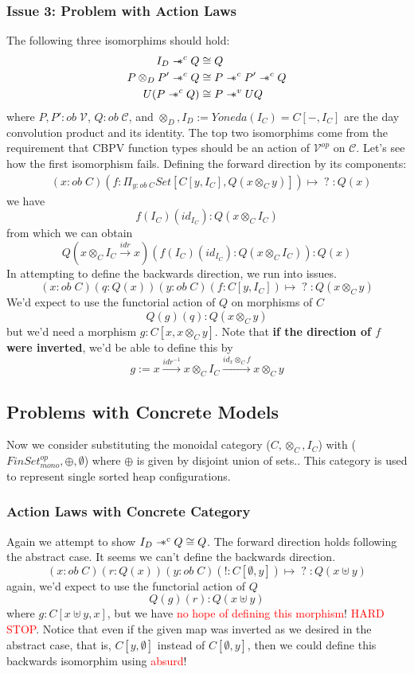 \documentclass{article}
\newcommand{\sep}{\mathrel{-\mkern-6mu*}}
\newcommand{\red}[1]{\textcolor{red}{#1}}
\begin{document}
\subsubsection{Issue 3: Problem with Action Laws}
The following three isomorphims should hold:
\begin{align*}
    I_{D} \sep^{c} Q &\cong Q\\
    P \otimes_D P' \sep^{c} Q &\cong P \sep^{c} P' \sep^{c} Q\\
    U(P \sep^{c}Q) &\cong P \sep^{v} UQ
\end{align*}
where $P , P' : ob \;\mathcal{V}$, $Q : ob \; \mathcal{C}$, and $\otimes_D,I_D:= Yoneda(I_C) = C[- , I_C]$ are the day convolution product and its identity.
The top two isomorphims come from the requirement that CBPV function types should be an action 
of $\mathcal{V}^{op}$ on $\mathcal{C}$. Let's see how the first isomorphism fails. 
Defining the forward direction by its components:
\begin{align*}
    &(x : ob \; C)(f : \Pi_{y : ob \;C}Set[C[y , I_C], Q(x \otimes_C y)]) \mapsto \;?\; : Q(x)
\end{align*}
we have
\[
  f(I_C)(id_{I_C}) : Q(x \otimes_C I_C)  
\]
from which we can obtain
\[
  Q(x \otimes_C I_C \xrightarrow{idr} x)(f(I_C)(id_{I_C}) : Q(x \otimes_C I_C)) : Q(x)  
\]
In attempting to define the backwards direction, we run into issues.
\[
    (x : ob \; C)(q : Q(x))(y : ob \;C)(f : C[y , I_C]) \mapsto \;?\; : Q (x \otimes_C y)    
\]
We'd expect to use the functorial action of $Q$ on morphisms of $C$
\[
    Q(g)(q) : Q(x \otimes_C y)
\]
but we'd need a morphism $g : C [ x , x\otimes_C y]$. 
Note that \textbf{if the direction of $f$ were inverted}, we'd be able to define this by 
\[
  g := x \xrightarrow{idr^{-1}} x \otimes_C I_C \xrightarrow{id_x \otimes_C f} x \otimes_C y  
\]

\subsection{Problems with Concrete Models}
Now we consider substituting the monoidal category ($C, \otimes_C , I_C$) with ($FinSet_{mono}^{op}, \oplus , \emptyset $)
where $\oplus$ is given by disjoint union of sets.. 
This category is used to represent single sorted heap configurations. 

\subsubsection{Action Laws with Concrete Category}
Again we attempt to show $I_{D} \sep^{c} Q \cong Q$. The forward direction holds following the abstract case.
It seems we can't define the backwards direction.
\[
    (x : ob \;C)(r : Q(x))(y : ob \;C)(! : C[ \emptyset, y] ) \mapsto \; ? \; : Q(x \uplus y)
\]
again, we'd expect to use the functorial action of $Q$
\[
    Q(g)(r) : Q (x \uplus y)    
\]
where $g : C[x \uplus y , x]$, but we have \red{no hope of defining this morphism}! \red{HARD STOP}.
Notice that even if the given map was inverted as we desired in the abstract case, that is, $C[y , \emptyset]$ 
instead of $C[\emptyset , y]$, then we could define this backwards isomorphim using \red{absurd}!
\end{document}
